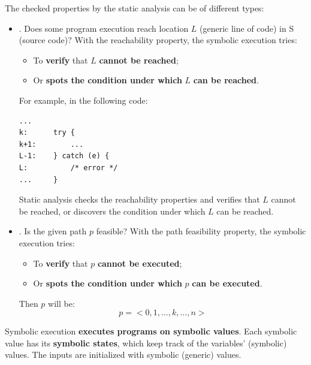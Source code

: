 The checked properties by the static analysis can be of different types:
\begin{itemize}
    \item {}. Does some program execution reach location $L$ (generic line of code) in S (source code)? With the reachability property, the symbolic execution tries:
    \begin{itemize}
        \item To \textbf{verify} that $L$ \textbf{cannot be reached};
        \item Or \textbf{spots the condition under which} $L$ \textbf{can be reached}.
    \end{itemize}
    For example, in the following code:
    \begin{lstlisting}
...
k:      try {
k+1:        ...
L-1:    } catch (e) {
L:          /* error */
...     }\end{lstlisting}
    Static analysis checks the reachability properties and verifies that $L$ cannot be reached, or discovers the condition under which $L$ can be reached.
    
    \item {}. Is the given path $p$ feasible? With the path feasibility property, the symbolic execution tries:
    \begin{itemize}
        \item To \textbf{verify} that $p$ \textbf{cannot be executed};
        \item Or \textbf{spots the condition under which} $p$ \textbf{can be executed}.
    \end{itemize}
    Then $p$ will be:
    \begin{equation*}
        p = < 0, 1, \dots, k, \dots, n >
    \end{equation*}
\end{itemize}
Symbolic execution \textbf{executes programs on symbolic values}. Each symbolic value has its \textbf{symbolic states}, which keep track of the variables' (symbolic) values. The inputs are initialized with symbolic (generic) values.

